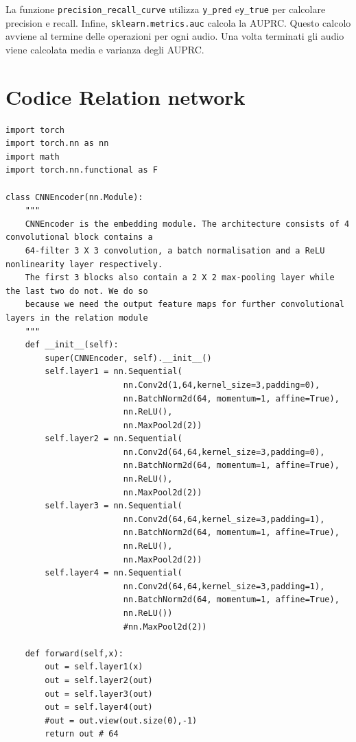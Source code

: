 \documentclass[12pt,a4paper,titlepage]{article}
\begin{document}
La funzione \texttt{precision\_recall\_curve} utilizza \texttt{y\_pred} e\texttt{y\_true} per calcolare precision e recall.
Infine, \texttt{sklearn.metrics.auc} calcola la AUPRC.
Questo calcolo avviene al termine delle operazioni per ogni audio.
Una volta terminati gli audio viene calcolata media e varianza degli AUPRC.

\section{Codice Relation network}
\begin{lstlisting}[language=iPython,firstnumber=1, caption=relation\_network.py, label=relation network,captionpos=b]
import torch
import torch.nn as nn
import math
import torch.nn.functional as F

class CNNEncoder(nn.Module):
    """
    CNNEncoder is the embedding module. The architecture consists of 4 convolutional block contains a 
    64-filter 3 X 3 convolution, a batch normalisation and a ReLU nonlinearity layer respectively. 
    The first 3 blocks also contain a 2 X 2 max-pooling layer while the last two do not. We do so 
    because we need the output feature maps for further convolutional layers in the relation module
    """
    def __init__(self):
        super(CNNEncoder, self).__init__()
        self.layer1 = nn.Sequential(
                        nn.Conv2d(1,64,kernel_size=3,padding=0),
                        nn.BatchNorm2d(64, momentum=1, affine=True),
                        nn.ReLU(),
                        nn.MaxPool2d(2))
        self.layer2 = nn.Sequential(
                        nn.Conv2d(64,64,kernel_size=3,padding=0),
                        nn.BatchNorm2d(64, momentum=1, affine=True),
                        nn.ReLU(),
                        nn.MaxPool2d(2))
        self.layer3 = nn.Sequential(
                        nn.Conv2d(64,64,kernel_size=3,padding=1),
                        nn.BatchNorm2d(64, momentum=1, affine=True),
                        nn.ReLU(),
                        nn.MaxPool2d(2))
        self.layer4 = nn.Sequential(
                        nn.Conv2d(64,64,kernel_size=3,padding=1),
                        nn.BatchNorm2d(64, momentum=1, affine=True),
                        nn.ReLU())
                        #nn.MaxPool2d(2))

    def forward(self,x):
        out = self.layer1(x)
        out = self.layer2(out)
        out = self.layer3(out)
        out = self.layer4(out)
        #out = out.view(out.size(0),-1)
        return out # 64


\end{lstlisting}
\end{document}
